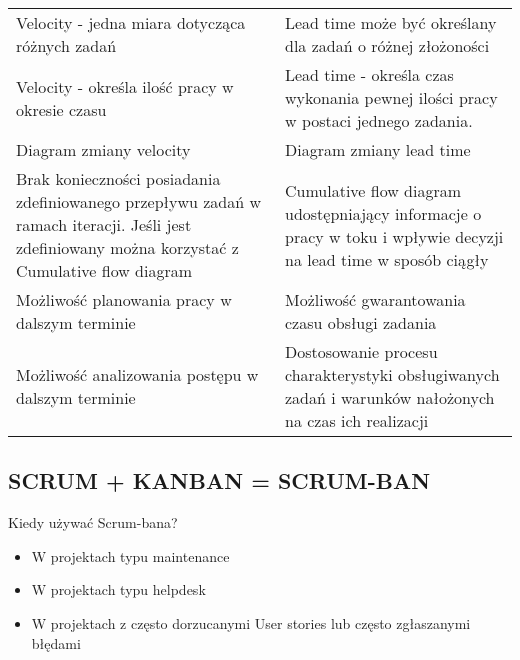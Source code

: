 \documentclass[../main.tex]{subfiles}
\begin{document}
\begin{table}[H]
\begin{center}
\begin{tabular}{ | p{8cm} p{8cm} |}
                \cmidrule(r){1-1}\cmidrule(l){2-2}
                Velocity - jedna miara dotycząca różnych zadań
                &
                Lead time może być określany dla zadań o różnej złożoności\\

                \cmidrule(r){1-1}\cmidrule(l){2-2}
                Velocity - określa ilość pracy w okresie czasu
                &
                Lead time - określa czas wykonania pewnej ilości pracy w postaci jednego zadania.\\

                \cmidrule(r){1-1}\cmidrule(l){2-2}
                Diagram zmiany velocity & Diagram zmiany lead time\\

                \cmidrule(r){1-1}\cmidrule(l){2-2}
                Brak konieczności posiadania zdefiniowanego przepływu zadań w ramach iteracji. Jeśli jest zdefiniowany
                można korzystać z Cumulative flow diagram
                &
                Cumulative flow diagram udostępniający informacje o pracy w toku i wpływie decyzji na lead time w sposób ciągły\\

                \cmidrule(r){1-1}\cmidrule(l){2-2}
                Możliwość planowania pracy w dalszym terminie
                &
                Możliwość gwarantowania czasu obsługi zadania\\

                \cmidrule(r){1-1}\cmidrule(l){2-2}
                Możliwość analizowania postępu w dalszym terminie
                &
                Dostosowanie procesu charakterystyki obsługiwanych zadań i warunków nałożonych na czas ich realizacji\\

                \bottomrule
            \end{tabular}
        \end{center}
    \end{table}





    \subsection{SCRUM + KANBAN = SCRUM-BAN}
    Kiedy używać Scrum-bana?
    \begin{itemize}
        \item W projektach typu maintenance
        \item W projektach typu helpdesk
        \item W projektach z często dorzucanymi User stories
        lub często zgłaszanymi błędami
    \end{itemize}
\end{document}
